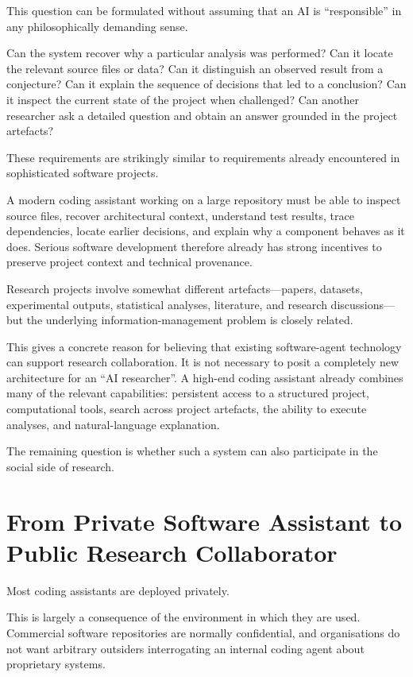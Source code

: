 This question can be formulated without assuming that an AI is ``responsible'' in any philosophically demanding sense.

Can the system recover why a particular analysis was performed? Can it locate the relevant source files or data? Can it distinguish an observed result from a conjecture? Can it explain the sequence of decisions that led to a conclusion? Can it inspect the current state of the project when challenged? Can another researcher ask a detailed question and obtain an answer grounded in the project artefacts?

These requirements are strikingly similar to requirements already encountered in sophisticated software projects.

A modern coding assistant working on a large repository must be able to inspect source files, recover architectural context, understand test results, trace dependencies, locate earlier decisions, and explain why a component behaves as it does. Serious software development therefore already has strong incentives to preserve project context and technical provenance.

Research projects involve somewhat different artefacts---papers, datasets, experimental outputs, statistical analyses, literature, and research discussions---but the underlying information-management problem is closely related.

This gives a concrete reason for believing that existing software-agent technology can support research collaboration. It is not necessary to posit a completely new architecture for an ``AI researcher''. A high-end coding assistant already combines many of the relevant capabilities: persistent access to a structured project, computational tools, search across project artefacts, the ability to execute analyses, and natural-language explanation.

The remaining question is whether such a system can also participate in the social side of research.


\section{From Private Software Assistant to Public Research Collaborator}

Most coding assistants are deployed privately.

This is largely a consequence of the environment in which they are used. Commercial software repositories are normally confidential, and organisations do not want arbitrary outsiders interrogating an internal coding agent about proprietary systems.

